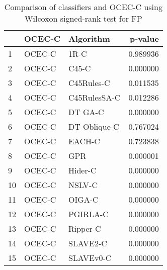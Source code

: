 \begin{table}
\footnotesize
\caption{Comparison of classifiers and OCEC-C using Wilcoxon signed-rank test for FP}
\label{tab:OCEC-C wilcoxon FP comparison}
\begin{tabular}{lllr}
\hline
 & OCEC-C & Algorithm & p-value \\
\hline
1 & OCEC-C & 1R-C & 0.989936 \\
2 & OCEC-C & C45-C & 0.000000 \\
3 & OCEC-C & C45Rules-C & 0.011535 \\
4 & OCEC-C & C45RulesSA-C & 0.012286 \\
5 & OCEC-C & DT GA-C & 0.000000 \\
6 & OCEC-C & DT Oblique-C & 0.767024 \\
7 & OCEC-C & EACH-C & 0.723838 \\
8 & OCEC-C & GPR & 0.000001 \\
9 & OCEC-C & Hider-C & 0.000000 \\
10 & OCEC-C & NSLV-C & 0.000000 \\
11 & OCEC-C & OIGA-C & 0.000000 \\
12 & OCEC-C & PGIRLA-C & 0.000000 \\
13 & OCEC-C & Ripper-C & 0.000000 \\
14 & OCEC-C & SLAVE2-C & 0.000000 \\
15 & OCEC-C & SLAVEv0-C & 0.000000 \\
\hline
\end{tabular}
\end{table}
